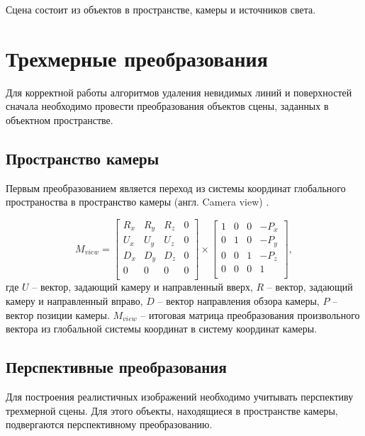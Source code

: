 Сцена состоит из объектов в пространстве, камеры и источников света.

\section{Трехмерные преобразования}
Для корректной работы алгоритмов удаления невидимых линий и поверхностей сначала необходимо провести преобразования объектов сцены, заданных в объектном пространстве.

\subsection{Пространство камеры}
Первым преобразованием является переход из системы координат глобального пространоства в пространство камеры (англ. Camera view) \cite{camera}.

\begin{equation}
M_{view} = 
\begin{bmatrix}
    R_x & R_y & R_z & 0 \\
    U_x & U_y & U_z & 0 \\
    D_x & D_y & D_z & 0 \\
    0   &  0  &  0  & 0 \\  
\end{bmatrix}
\times
\begin{bmatrix}
    1 & 0 & 0 & -P_x \\
    0 & 1 & 0 & -P_y \\
    0 & 0 & 1 & -P_z \\
    0 & 0 & 0 & 1    \\  
\end{bmatrix},
\end{equation}
где $U$ -- вектор, задающий камеру и направленный вверх, $R$ -- вектор, задающий камеру и направленный вправо, $D$ -- вектор направления обзора камеры, $P$ -- вектор позиции камеры. $M_{view}$ -- итоговая матрица преобразования произвольного вектора из глобальной системы координат в систему координат камеры.

\subsection{Перспективные преобразования}
Для построения реалистичных изображений необходимо учитывать перспективу трехмерной сцены. Для этого объекты, находящиеся в пространстве камеры, подвергаются перспективному преобразованию.

